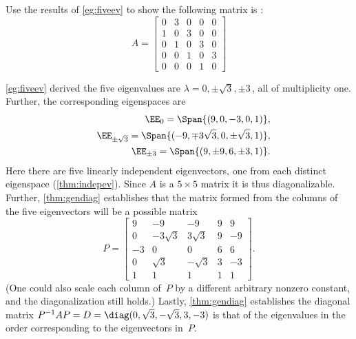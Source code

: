 \begin{example} \label{eg:fiveevp}
Use the results of \autoref{eg:fiveev} to show the following matrix is :
\begin{equation*}
A=\begin{bmatrix}0&3&0&0&0
\\1&0&3&0&0
\\0&1&0&3&0
\\0&0&1&0&3
\\0&0&0&1&0\end{bmatrix}
\end{equation*}
\begin{solution} 
\autoref{eg:fiveev} derived the five eigenvalues are  \(\lambda=0,\pm\sqrt3,\pm3\)\,, all of multiplicity one.
Further, the corresponding eigenspaces are
\begin{eqnarray*}
&&\EE_0=\Span\{(9,0,-3,0,1)\},
\\&&\EE_{\pm\sqrt3}=\Span\{(-9,\mp3\sqrt3,0,\pm\sqrt3,1)\},
\\&&\EE_{\pm3}=\Span\{(9,\pm9,6,\pm3,1)\}.
\end{eqnarray*}
Here there are five linearly independent eigenvectors, one from each distinct eigenspace  (\autoref{thm:indepev}).
Since \(A\) is a \(5\times5\) matrix it is thus diagonalizable.
Further, \autoref{thm:gendiag} establishes that the matrix formed from the columns of the five eigenvectors will be a possible matrix
\begin{equation*}
P=\begin{bmatrix} 9&-9&-9&9&9
\\0&-3\sqrt3&3\sqrt3&9&-9
\\-3&0&0&6&6
\\0&\sqrt3&-\sqrt3&3&-3
\\1&1&1&1&1
\end{bmatrix}.
\end{equation*}
(One could also scale each column of~\(P\) by a different arbitrary nonzero constant, and the diagonalization still holds.)
Lastly, \autoref{thm:gendiag} establishes the diagonal matrix
\(P^{-1}AP=D=\diag(0,\sqrt3,-\sqrt3,3,-3)\) is that of the eigenvalues in the order corresponding to the eigenvectors in~\(P\).
\end{solution}
\end{example}





